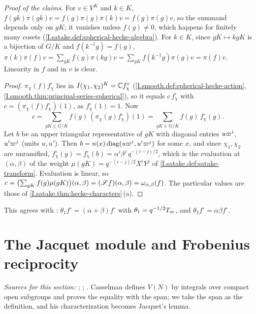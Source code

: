 \noindent\emph{Proof of the claims.} For $v\in V^K$ and $k\in K$, $f(gk)\pi(gk)v=f(g)\pi(g)\pi(k)v=f(g)\pi(g)v$, so the
summand depends only on $gK$; it vanishes unless $f(g)\neq0$, which happens for finitely many cosets
(\cref{I.satake.def:spherical-hecke-algebra}). For $k\in K$, since $gK\mapsto kgK$ is a bijection of $G/K$ and
$f(k^{-1}g)=f(g)$,
$\pi(k)\pi(f)v=\sum_{gK}f(g)\pi(kg)v=\sum_{gK}f(k^{-1}g)\pi(g)v=\pi(f)v$. Linearity in $f$ and in $v$ is clear.

\begin{theorem}
\end{theorem}
\begin{proof}
$\pi_\chi(f)f^\circ_\chi$ lies in $I(\chi_1,\chi_2)^K=\mathbb{C} f^\circ_\chi$ (\cref{I.smooth.def:spherical-hecke-action},
\cref{I.smooth.thm:principal-series-spherical}), so it equals $c\,f^\circ_\chi$ with $c=(\pi_\chi(f)f^\circ_\chi)(1)$, as
$f^\circ_\chi(1)=1$. Now
\[
  c=\sum_{gK\in G/K}f(g)\,(\pi_\chi(g)f^\circ_\chi)(1)=\sum_{gK\in G/K}f(g)\,f^\circ_\chi(g).
\]
Let $b$ be an upper triangular representative of $gK$ with diagonal entries $u\varpi^i$, $u'\varpi^j$ (units $u,u'$).
Then $b=n(x)\operatorname{diag}(u\varpi^i,u'\varpi^j)$ for some $x$, and since $\chi_1,\chi_2$ are unramified,
$f^\circ_\chi(g)=f^\circ_\chi(b)=\alpha^i\beta^j\,q^{-(i-j)/2}$, which is the evaluation at $(\alpha,\beta)$ of the weight
$\mu(gK)=q^{-(i-j)/2}X^iY^j$ of \cref{I.satake.def:satake-transform}. Evaluation is linear, so
$c=\bigl(\sum_{gK}f(g)\mu(gK)\bigr)(\alpha,\beta)=(\mathscr{S} f)(\alpha,\beta)=\omega_{\alpha,\beta}(f)$. The particular values
are those of \cref{I.satake.thm:hecke-characters}\,(a).
\end{proof}

\noindent This agrees with \cite[Proposition~40, p.~55]{BumpH}: $\theta_1f^\circ=(\alpha+\beta)f^\circ$ with
$\theta_1=q^{-1/2}T_\varpi$, and $\theta_2f^\circ=\alpha\beta f^\circ$.

\section{The Jacquet module and Frobenius reciprocity}\label{sec:smooth-jacquet}

{\sloppy\noindent\emph{Sources for this section:} \cite[§3.2, Proposition~3.2.1, Corollary~3.2.2, Proposition~3.2.3
and Theorem~3.2.4, pp.~33--34]{Cas-p}; \cite[§2.4, Frobenius reciprocity, p.~26]{Cas-p}; \cite[§2]{BZ}. Casselman defines
$V(N)$ by integrals over compact open subgroups and proves the equality with the span; we take the span as the
definition, and his characterization becomes Jacquet's lemma.\par}

